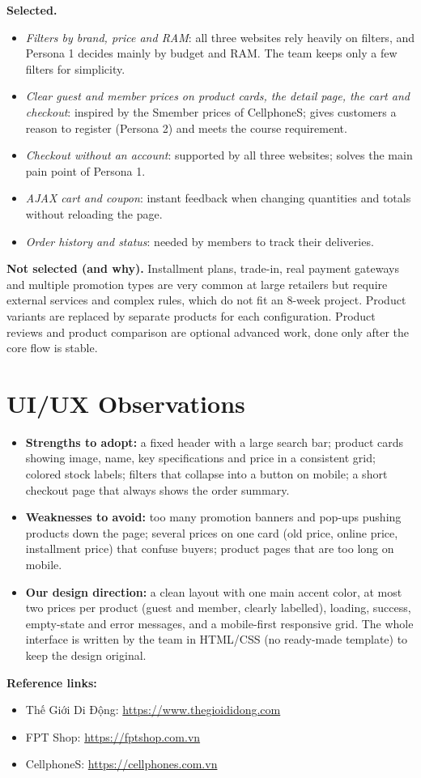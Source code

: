 \documentclass[12pt,a4paper]{article}
\begin{document}
\textbf{Selected.}
\begin{itemize}
  \item \emph{Filters by brand, price and RAM}: all three websites rely heavily on filters, and
        Persona 1 decides mainly by budget and RAM. The team keeps only a few filters for simplicity.
  \item \emph{Clear guest and member prices on product cards, the detail page, the cart and checkout}:
        inspired by the Smember prices of CellphoneS; gives customers a reason to register
        (Persona 2) and meets the course requirement.
  \item \emph{Checkout without an account}: supported by all three websites; solves the main pain point of Persona 1.
  \item \emph{AJAX cart and coupon}: instant feedback when changing quantities and totals without reloading the page.
  \item \emph{Order history and status}: needed by members to track their deliveries.
\end{itemize}

\textbf{Not selected (and why).}
Installment plans, trade-in, real payment gateways and multiple promotion types are very common at
large retailers but require external services and complex rules, which do not fit an 8-week project.
Product variants are replaced by separate products for each configuration. Product reviews and
product comparison are optional advanced work, done only after the core flow is stable.

\section{UI/UX Observations}

\begin{itemize}
  \item \textbf{Strengths to adopt:} a fixed header with a large search bar; product cards showing
        image, name, key specifications and price in a consistent grid; colored stock labels;
        filters that collapse into a button on mobile; a short checkout page that always shows the order summary.
  \item \textbf{Weaknesses to avoid:} too many promotion banners and pop-ups pushing products down the page;
        several prices on one card (old price, online price, installment price) that confuse buyers;
        product pages that are too long on mobile.
  \item \textbf{Our design direction:} a clean layout with one main accent color, at most two prices
        per product (guest and member, clearly labelled), loading, success, empty-state and error
        messages, and a mobile-first responsive grid. The whole interface is written by the team in
        HTML/CSS (no ready-made template) to keep the design original.
\end{itemize}

\textbf{Reference links:}
\begin{itemize}
  \item Thế Giới Di Động: \url{https://www.thegioididong.com}
  \item FPT Shop: \url{https://fptshop.com.vn}
  \item CellphoneS: \url{https://cellphones.com.vn}
\end{itemize}
\end{document}

